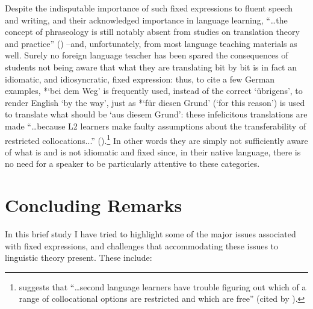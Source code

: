 \documentclass[output=paper]{langsci/langscibook}
\begin{document}
Despite the indisputable importance of such fixed expressions to fluent speech and writing, and their acknowledged importance in language learning, “…the concept of phraseology is still notably absent from studies on translation theory and practice” (\citealt[xxiv]{granger_phraseology:_2008}) –and, unfortunately, from most language teaching materials as well. Surely no foreign language teacher has been spared the consequences of students not being aware that what they are translating bit by bit is in fact an idiomatic, and idiosyncratic, fixed expression: thus, to cite a few German examples, *‘bei dem  Weg’ is frequently used, instead of the correct ‘übrigens’, to render English ‘by the way’, just as *‘für diesen Grund’ (‘for this reason’) is used to translate what should be ‘aus diesem Grund’: these infelicitous translations are made “…because L2 learners make faulty assumptions about the transferability of restricted collocations...” (\citealt[833]{kim_frequency_2012}).\footnote{ \textrm{\citet[34]{howarth_phraseology_1998} suggests that “…second language learners have trouble figuring out which of a range of collocational options are restricted and which are free” (cited by \citealt[833]{kim_frequency_2012}).}} In other words they are simply not sufficiently aware of what is and is not idiomatic and fixed since, in their native language, there is no need for a speaker to be particularly attentive to these categories.

\section{Concluding Remarks}
In this brief study I have tried to highlight some of the major issues associated with fixed expressions, and challenges that accommodating these issues to linguistic theory present. These include:
\end{document}
